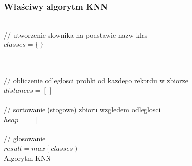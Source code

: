 \documentclass[12pt,a4paper]{article}
\begin{document}
            \subsubsection*{Właściwy algorytm KNN}
                \begin{algorithm}[H]
                        ~\\
                        // utworzenie slownika na podstawie nazw klas\\
                        $classes = \{~\}$\\
                        ~\\
                        \label{alg:KNN}
                    \end{algorithm}
                    \begin{algorithm}[H]
                        ~\\
                        // obliczenie odleglosci probki od kazdego rekordu w zbiorze\\
                        $distances = [~]$\\
                        ~\\
                        // sortowanie (stogowe) zbioru wzgledem odleglosci\\
                        $heap = [~]$\\
                        ~\\
                        // glosowanie\\
                        $result = max(classes)$
                        ~\\
                        \caption{Algorytm KNN}
                    \end{algorithm}
        
\end{document}
